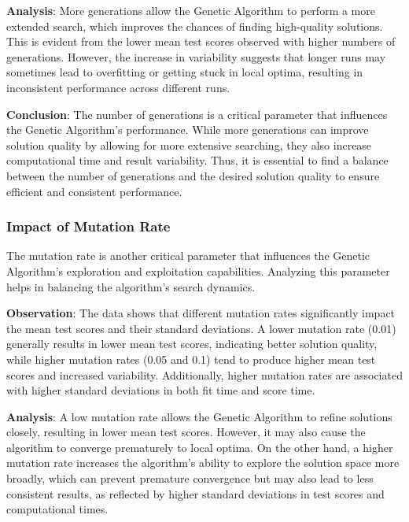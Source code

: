 \documentclass[
]{article}
\begin{document}
    \textbf{Analysis}: More generations allow the Genetic Algorithm to perform a more extended search, which improves the chances of finding high-quality solutions. This is evident from the lower mean test scores observed with higher numbers of generations. However, the increase in variability suggests that longer runs may sometimes lead to overfitting or getting stuck in local optima, resulting in inconsistent performance across different runs.

    \textbf{Conclusion}: The number of generations is a critical parameter that influences the Genetic Algorithm's performance. While more generations can improve solution quality by allowing for more extensive searching, they also increase computational time and result variability. Thus, it is essential to find a balance between the number of generations and the desired solution quality to ensure efficient and consistent performance.

    \subsubsection{Impact of Mutation Rate}

    The mutation rate is another critical parameter that influences the Genetic Algorithm’s exploration and exploitation capabilities. Analyzing this parameter helps in balancing the algorithm’s search dynamics.

    \textbf{Observation}: The data shows that different mutation rates significantly impact the mean test scores and their standard deviations. A lower mutation rate (0.01) generally results in lower mean test scores, indicating better solution quality, while higher mutation rates (0.05 and 0.1) tend to produce higher mean test scores and increased variability. Additionally, higher mutation rates are associated with higher standard deviations in both fit time and score time.

    \textbf{Analysis}: A low mutation rate allows the Genetic Algorithm to refine solutions closely, resulting in lower mean test scores. However, it may also cause the algorithm to converge prematurely to local optima. On the other hand, a higher mutation rate increases the algorithm's ability to explore the solution space more broadly, which can prevent premature convergence but may also lead to less consistent results, as reflected by higher standard deviations in test scores and computational times.
\end{document}
